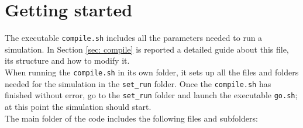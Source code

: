 \chapter{Getting started}
The executable \texttt{compile.sh} includes all the parameters needed to run a simulation. In Section \ref{sec: compile} is reported a detailed guide about this file, its structure and how to modify it.\\
When running the \texttt{compile.sh} in its own folder, it sets up all the files and folders needed for the simulation in the \texttt{set\_run} folder.
Once the \texttt{compile.sh} has finished without error, go to the \texttt{set\_run} folder and launch the executable \texttt{go.sh}; at this point the simulation should start.\\
The main folder of the code includes the following files and subfolders:
